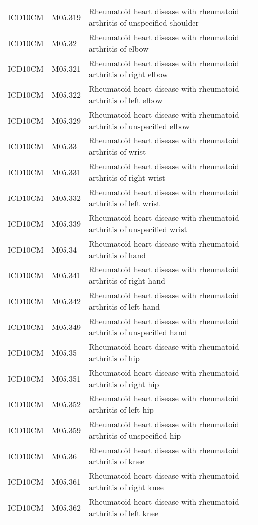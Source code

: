 \begin{table}[ht]
\begin{tabular}{lll}
  ICD10CM & M05.319 & Rheumatoid heart disease with rheumatoid arthritis of unspecified shoulder \\ 
  ICD10CM & M05.32 & Rheumatoid heart disease with rheumatoid arthritis of elbow \\ 
  ICD10CM & M05.321 & Rheumatoid heart disease with rheumatoid arthritis of right elbow \\ 
  ICD10CM & M05.322 & Rheumatoid heart disease with rheumatoid arthritis of left elbow \\ 
  ICD10CM & M05.329 & Rheumatoid heart disease with rheumatoid arthritis of unspecified elbow \\ 
  ICD10CM & M05.33 & Rheumatoid heart disease with rheumatoid arthritis of wrist \\ 
  ICD10CM & M05.331 & Rheumatoid heart disease with rheumatoid arthritis of right wrist \\ 
  ICD10CM & M05.332 & Rheumatoid heart disease with rheumatoid arthritis of left wrist \\ 
  ICD10CM & M05.339 & Rheumatoid heart disease with rheumatoid arthritis of unspecified wrist \\ 
  ICD10CM & M05.34 & Rheumatoid heart disease with rheumatoid arthritis of hand \\ 
  ICD10CM & M05.341 & Rheumatoid heart disease with rheumatoid arthritis of right hand \\ 
  ICD10CM & M05.342 & Rheumatoid heart disease with rheumatoid arthritis of left hand \\ 
  ICD10CM & M05.349 & Rheumatoid heart disease with rheumatoid arthritis of unspecified hand \\ 
  ICD10CM & M05.35 & Rheumatoid heart disease with rheumatoid arthritis of hip \\ 
  ICD10CM & M05.351 & Rheumatoid heart disease with rheumatoid arthritis of right hip \\ 
  ICD10CM & M05.352 & Rheumatoid heart disease with rheumatoid arthritis of left hip \\ 
  ICD10CM & M05.359 & Rheumatoid heart disease with rheumatoid arthritis of unspecified hip \\ 
  ICD10CM & M05.36 & Rheumatoid heart disease with rheumatoid arthritis of knee \\ 
  ICD10CM & M05.361 & Rheumatoid heart disease with rheumatoid arthritis of right knee \\ 
  ICD10CM & M05.362 & Rheumatoid heart disease with rheumatoid arthritis of left knee \\ 

\end{tabular}
\end{table}
